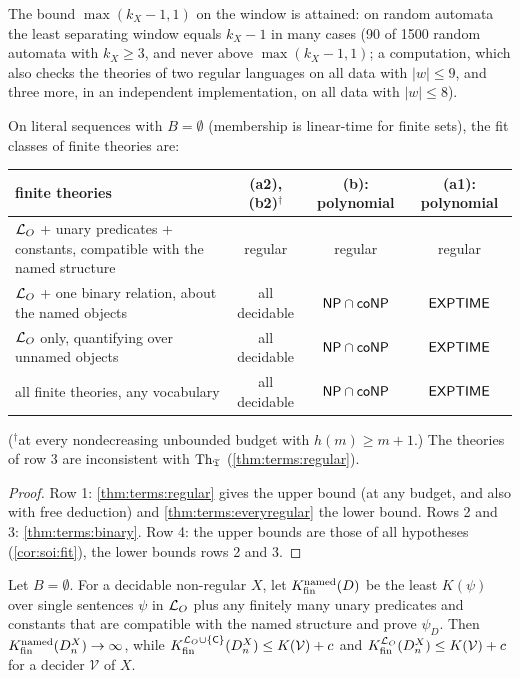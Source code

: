 The bound $\max(k_X-1,1)$ on the window is attained: on random automata the least separating window equals $k_X-1$ in many cases (90 of 1500 random automata with $k_X\ge3$, and never above $\max(k_X-1,1)$; a computation, which also checks the theories of two regular languages on all data with $\lvert w\rvert\le9$, and three more, in an independent implementation, on all data with $\lvert w\rvert\le8$).

\begin{corollary}\label{cor:terms:ontology}
On literal sequences with $B=\emptyset$ (membership is linear-time for finite sets), the fit classes of finite theories are:
\begin{center}\small
\begin{tabular}{@{}p{}ccc@{}}
\toprule
finite theories & (a2), (b2)$^\dagger$ & (b): polynomial & (a1): polynomial\\
\midrule
$\mathcal{L}_{O}$ + unary predicates + constants, compatible with the named structure & regular & regular & regular\\
$\mathcal{L}_{O}$ + one binary relation, about the named objects & all decidable & $\mathsf{NP}\cap\mathsf{coNP}$ & $\mathsf{EXPTIME}$\\
$\mathcal{L}_{O}$ only, quantifying over unnamed objects & all decidable & $\mathsf{NP}\cap\mathsf{coNP}$ & $\mathsf{EXPTIME}$\\
all finite theories, any vocabulary & all decidable & $\mathsf{NP}\cap\mathsf{coNP}$ & $\mathsf{EXPTIME}$\\
\bottomrule
\end{tabular}
\end{center}
($^\dagger$at every nondecreasing unbounded budget with $h(m)\ge m+1$.) The theories of row 3 are inconsistent with $\mathrm{Th}_{\mathfrak{T}}$ (\cref{thm:terms:regular}).
\end{corollary}

\begin{proof}
Row 1: \cref{thm:terms:regular} gives the upper bound (at any budget, and also with free deduction) and \cref{thm:terms:everyregular} the lower bound. Rows 2 and 3: \cref{thm:terms:binary}. Row 4: the upper bounds are those of all hypotheses (\cref{cor:soi:fit}), the lower bounds rows 2 and 3.
\end{proof}

\begin{corollary}\label{cor:terms:freededuction}
Let $B=\emptyset$. For a decidable non-regular $X$, let $K^{\rm named}_{\rm fin}(D)$ be the least $K(\psi)$ over single sentences $\psi$ in $\mathcal{L}_{O}$ plus any finitely many unary predicates and constants that are compatible with the named structure and prove $\psi_D$. Then $K^{\rm named}_{\rm fin}(D^X_n)\to\infty$, while $K_{\mathrm{fin}}^{\mathcal{L}_{O}\cup\{\mathsf C\}}(D^X_n)\le K(\mathcal V)+c$ and $K_{\mathrm{fin}}^{\mathcal{L}_{O}}(D^X_n)\le K(\mathcal V)+c$ for a decider $\mathcal V$ of $X$.
\end{corollary}

